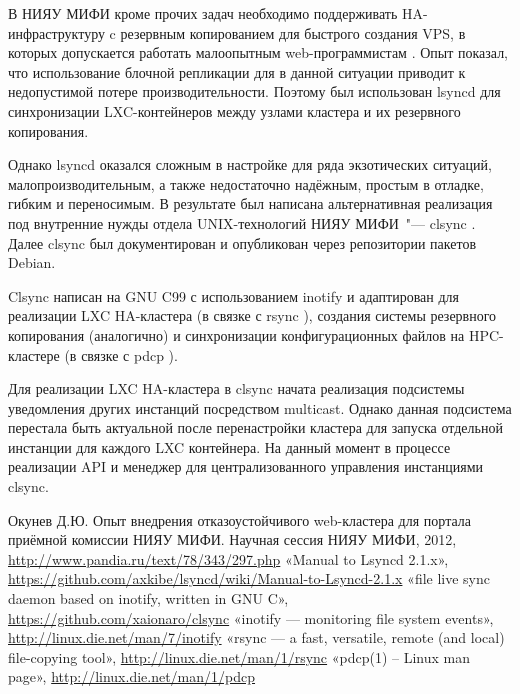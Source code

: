 \documentclass[10pt, a5paper]{article}
\begin{document}
В НИЯУ МИФИ кроме прочих задач необходимо поддерживать HA-инфраструктуру c резервным копированием для быстрого создания VPS, в которых допускается работать малоопытным web-программистам \cite{OkW1}. Опыт показал, что использование блочной репликации для в данной ситуации приводит к недопустимой потере производительности. Поэтому был использован lsyncd \cite{OkW2} для синхронизации LXC-контейнеров между узлами кластера и их резервного копирования.

Однако lsyncd оказался сложным в настройке для ряда экзотических ситуаций, малопроизводительным, а также недостаточно надёжным, простым в отладке, гибким и переносимым. В результате был написана альтернативная реализация под внутренние нужды отдела UNIX-технологий НИЯУ МИФИ "--- clsync \cite{OkW3}. Далее clsync был документирован и опубликован через репозитории пакетов Debian.

Clsync написан на GNU C99 с использованием inotify \cite{OkW4} и адаптирован для реализации LXC HA-кластера (в связке с rsync \cite{OkW5}), создания системы резервного копирования (аналогично) и синхронизации конфигурационных файлов на HPC-кластере (в связке с pdcp \cite{OkW6}).

Для реализации LXC HA-кластера в clsync начата реализация подсистемы уведомления других инстанций посредством multicast. Однако данная подсистема перестала быть актуальной после перенастройки кластера для запуска отдельной инстанции для каждого LXC контейнера. На данный момент в процессе реализации API и менеджер для централизованного управления инстанциями clsync.

\begin{thebibliography}{9}
 Окунев Д.Ю. Опыт внедрения отказоустойчивого web-кластера для портала приёмной комиссии НИЯУ МИФИ. Научная сессия НИЯУ МИФИ, 2012, \url{http://www.pandia.ru/text/78/343/297.php}
 «Manual to Lsyncd 2.1.x», \url{https://github.com/axkibe/lsyncd/wiki/Manual-to-Lsyncd-2.1.x}
 «file live sync daemon based on inotify, written in GNU C», \url{https://github.com/xaionaro/clsync}
 «inotify --- monitoring file system events», \url{http://linux.die.net/man/7/inotify}
 «rsync --- a fast, versatile, remote (and local) file-copying tool», \url{http://linux.die.net/man/1/rsync}
 «pdcp(1) -- Linux man page», \url{http://linux.die.net/man/1/pdcp}
\end{thebibliography}
\end{document}
